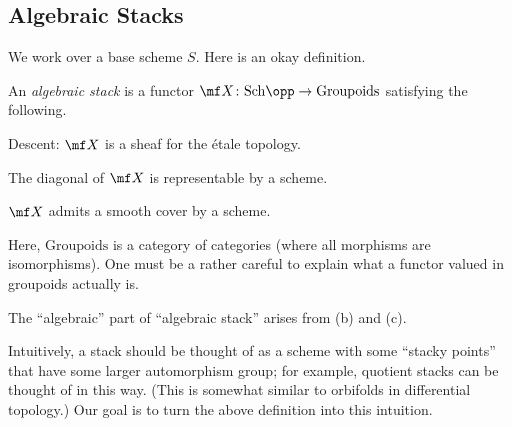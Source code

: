 \documentclass{article}
\begin{document}
\subsection{Algebraic Stacks}
We work over a base scheme $S$. Here is an okay definition.
\begin{definition}
    An \textit{algebraic stack} is a functor $\mf X\colon\mathrm{Sch}\opp\to\mathrm{Groupoids}$ satisfying the following.
    \begin{listalph}
        \item Descent: $\mf X$ is a sheaf for the \'etale topology.
        \item The diagonal of $\mf X$ is representable by a scheme.
        \item $\mf X$ admits a smooth cover by a scheme.
    \end{listalph}
\end{definition}
\begin{remark}
    Here, $\mathrm{Groupoids}$ is a category of categories (where all morphisms are isomorphisms). One must be a rather careful to explain what a functor valued in groupoids actually is.
\end{remark}
\begin{remark}
    The ``algebraic'' part of ``algebraic stack'' arises from (b) and (c).
\end{remark}
Intuitively, a stack should be thought of as a scheme with some ``stacky points'' that have some larger automorphism group; for example, quotient stacks can be thought of in this way. (This is somewhat similar to orbifolds in differential topology.) Our goal is to turn the above definition into this intuition.
\end{document}
